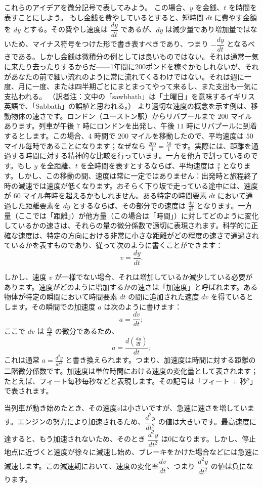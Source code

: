 \documentclass[a4paper,11pt,openany]{ltjsbook}
\begin{document}
これらのアイデアを微分記号で表してみよう。
この場合、$y$ を金銭、$t$ を時間を表すことにしよう。
もし金銭を費やしているとすると、短時間 $dt$ に費やす金額を $dy$ とする。その費やし速度は $\dfrac{dy}{dt}$ であるが、$dy$ は減少量であり増加量ではないため、マイナス符号をつけた形で書き表すべきであり、つまり $-\dfrac{dy}{dt}$ となるべきである。しかし金銭は微積分の例としては良いものではない。それは通常一気に来たり去ったりするからだ——1年間に200ポンドを稼ぐかもしれないが、それがあなたの前で細い流れのように常に流れてくるわけではない。それは週に一度、月に一度、または四半期ごとにまとまってやって来るし、また支出も一気に支払われる。
（訳者注：文中の「sawbbath」は「土曜日」を意味するイギリス英語で、「Sabbath」の誤植と思われる。）
より適切な速度の概念を示す例は、移動物体の速さです。ロンドン（ユーストン駅）からリバプールまで $200$ マイルあります。列車が午後 $7$ 時にロンドンを出発し、午後 $11$ 時にリバプールに到着するとします。この場合、$4$ 時間で $200$ マイルを移動したので、平均速度は $50$ マイル每時であることになります；なぜなら $\frac{200}{4} = \frac{50}{1}$ です。実際には、距離を通過する時間に対する精神的な比較を行っています。一方を他方で割っているのです。もし $y$ を全距離、$t$ を全時間を表すとするならば、平均速度は $\frac{y}{t}$ となります。しかし、この移動の間、速度は常に一定ではありません：出発時と旅程終了時の減速では速度が低くなります。おそらく下り坂で走っている途中には、速度が $60$ マイル每時を超えるかもしれません。ある特定の時間要素 $dt$ において通過した距離要素を $dy$ とするならば、その部分での速度は $\frac{dy}{dt}$ となります。一方量（ここでは「距離」）が他方量（この場合は「時間」）に対してどのように変化しているかの速さは、それらの量の微分係数で適切に表現されます。科学的に正確な速度は、特定の方向における非常に小さな距離がどの程度の速さで通過されているかを表すものであり、従って次のように書くことができます：
\[
v = \frac{dy}{dt}.
\]

しかし、速度 $v$ が一様でない場合、それは増加しているか減少している必要があります。速度がどのように増加するかの速さは「加速度」と呼ばれます。ある物体が特定の瞬間において時間要素 $dt$ の間に追加された速度 $dv$ を得ているとします。その瞬間での加速度 $a$ は次のように書けます：
\[
a = \frac{dv}{dt};
\]
ここで $dv$ は $\frac{dy}{dt}$ の微分であるため、
\[
a = \frac{d\left( \frac{dy}{dt} \right)}{dt};
\]
これは通常 $a = \frac{d^2y}{dt^2}$ と書き換えられます。つまり、加速度は時間に対する距離の二階微分係数です。加速度は単位時間における速度の変化量として表されます；たとえば、フィート每秒毎秒などと表現します。その記号は「フィート ÷ 秒$^2$」で表されます。

当列車が動き始めたとき、その速度$v$は小さいですが、急速に速さを増しています。エンジンの努力により加速されるため、$\dfrac{d^2y}{dt^2}$ の値は大きいです。最高速度に達すると、もう加速されないため、そのとき $\dfrac{d^2y}{dt^2}$ は0になります。しかし、停止地点に近づくと速度が徐々に減速し始め、ブレーキをかけた場合などには急速に減速します。この減速期において、速度の変化率$\dfrac{dv}{dt}$、つまり $\dfrac{d^2y}{dt^2}$ の値は負になります。
\end{document}
